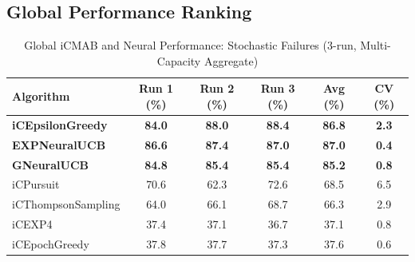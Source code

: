 \documentclass[12pt,a4paper]{article}
\newcommand{\primarytext}[1]{\textcolor{primaryblue}{\textbf{#1}}}
\newcommand{\legacy}[1]{\textcolor{legacycolor}{\textbf{#1}}}
\newcommand{\neural}[1]{\textcolor{neuralcolor}{\textbf{#1}}}
\begin{document}
\begin{tcolorbox}[colback=tableheader,colframe=primaryblue,title=\textbf{Primary iCMAB Performance Results (Stochastic Environment, Attack Rate: 0.25)}]

\subsection{Global Performance Ranking}

\begin{table}[H]
\centering
\caption{Global iCMAB and Neural Performance: Stochastic Failures (3-run, Multi-Capacity Aggregate)}
\label{tab:global-performance-stochastic}
\begin{tabular}{@{}lccccc@{}}
\toprule
\textbf{Algorithm} & \textbf{Run 1 (\%)} & \textbf{Run 2 (\%)} & \textbf{Run 3 (\%)} & \textbf{Avg (\%)} & \textbf{CV (\%)} \\
\midrule
\primarytext{iCEpsilonGreedy}   & \primarytext{84.0} & \primarytext{88.0} & \primarytext{88.4} & \primarytext{86.8} & \primarytext{2.3} \\
\legacy{EXPNeuralUCB}           & \legacy{86.6} & \legacy{87.4} & \legacy{87.0} & \legacy{87.0} & \legacy{0.4} \\
\neural{GNeuralUCB}            & \neural{84.8} & \neural{85.4} & \neural{85.4} & \neural{85.2} & \neural{0.8} \\
iCPursuit                       & 70.6 & 62.3 & 72.6 & 68.5 & 6.5 \\
iCThompsonSampling              & 64.0 & 66.1 & 68.7 & 66.3 & 2.9 \\
iCEXP4                          & 37.4 & 37.1 & 36.7 & 37.1 & 0.8 \\
iCEpochGreedy                   & 37.8 & 37.7 & 37.3 & 37.6 & 0.6 \\
\bottomrule
\end{tabular}
\end{table}


\end{tcolorbox}
\end{document}
